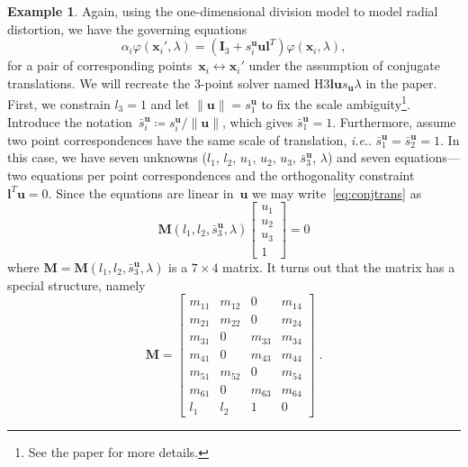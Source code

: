 \documentclass[11pt,a4paper]{article}
\makeatletter
\theoremstyle{definition}
\newtheorem{example}{Example}
\renewcommand{\phi}{\varphi}
\newcommand{\T}{T}
\newcommand{\mat}[1]{\bm{#1}}
\newcommand{\norm}[1]{\left\|#1\right\|}
\DeclareRobustCommand\ie{\emph{i.e}\@ifnextchar.{}{.\@}}
\makeatother
\begin{document}
\begin{example}\label{ex:hidden4}
Again, using the one-dimensional division model to model radial distortion, we have the
governing equations
\begin{equation}\label{eq:conjtrans}
\alpha_i \phi(\mat{x}_i',\lambda) = \left(\mat{I}_3+s_i^{\mat{u}}\mat{ul}^\T\right)\phi(\mat{x}_i,\lambda),
\end{equation}
for a pair of corresponding points~$\mat{x}_i\leftrightarrow\mat{x}_i'$ under the assumption of
conjugate translations. We will recreate the 3-point solver named H3$\mat{lu}s_{\mat{u}}\lambda$
in the paper. First, we constrain $l_3=1$ and let $\norm{\mat{u}}=s_1^{\mat{u}}$ to fix the scale
ambiguity\footnote{See the paper for more details.}.
Introduce the notation~$\bar{s}_i^{\mat{u}}\coloneqq s_i^{\mat{u}} / \norm{\mat{u}}$, which gives $\bar{s}_1^{\mat{u}}=1$. Furthermore, assume two point correspondences have the same scale of translation,
\ie{} $\bar{s}_1^{\mat{u}} = \bar{s}_2^{\mat{u}} = 1$. In this case, we have seven unknowns ($l_1$,
$l_2$, $u_1$, $u_2$, $u_3$, $\bar{s}_3^{\mat{u}}$, $\lambda$) and seven equations---two equations
per point correspondences and the orthogonality constraint~$\mat{l}^\T\mat{u}= 0$.
Since the equations are linear in~$\mat{u}$ we may write~\eqref{eq:conjtrans} as
\begin{equation}
\mat{M}(l_1,l_2,\bar{s}_3^{\mat{u}},\lambda)\begin{bmatrix} u_1 \\ u_2 \\ u_3 \\1\end{bmatrix} = 0
\end{equation}
where $\mat{M} = \mat{M}(l_1,l_2,\bar{s}_3^{\mat{u}},\lambda)$ is a $7\times 4$ matrix. It turns out that
the matrix has a special structure, namely
\begin{equation}\label{eq:pritts-M}
\mat{M} = \begin{bmatrix}
m_{11} & m_{12} &      0 & m_{14} \\
m_{21} & m_{22} &      0 & m_{24} \\
m_{31} &      0 & m_{33} & m_{34} \\
m_{41} &      0 & m_{43} & m_{44} \\
m_{51} & m_{52} &      0 & m_{54} \\
m_{61} &      0 & m_{63} & m_{64} \\
l_1 & l_2 &   1 & 0
\end{bmatrix}\;.
\end{equation}
\end{example}
\end{document}
